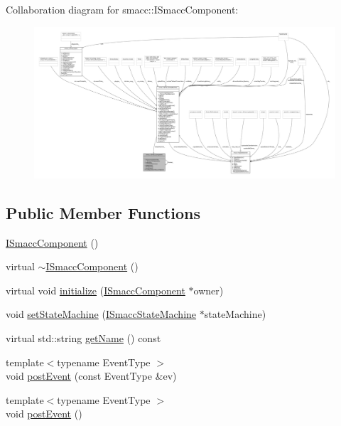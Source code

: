 Collaboration diagram for smacc\+:\+:I\+Smacc\+Component\+:
\nopagebreak
\begin{figure}[H]
\begin{center}
\leavevmode
\includegraphics[width=350pt]{classsmacc_1_1ISmaccComponent__coll__graph}
\end{center}
\end{figure}
\subsection*{Public Member Functions}
\begin{DoxyCompactItemize}
\item 
\hyperlink{classsmacc_1_1ISmaccComponent_a43952d7269ddb81d017a80f018fe502e}{I\+Smacc\+Component} ()
\item 
virtual \hyperlink{classsmacc_1_1ISmaccComponent_a46f5cfc6a308de938b6ee3a5e80a8fe9}{$\sim$\+I\+Smacc\+Component} ()
\item 
virtual void \hyperlink{classsmacc_1_1ISmaccComponent_a15c111f1a7c6fe37e77351b382d2f095}{initialize} (\hyperlink{classsmacc_1_1ISmaccComponent}{I\+Smacc\+Component} $\ast$owner)
\item 
void \hyperlink{classsmacc_1_1ISmaccComponent_afe57665a6982475e8f9c2a5885e986e1}{set\+State\+Machine} (\hyperlink{classsmacc_1_1ISmaccStateMachine}{I\+Smacc\+State\+Machine} $\ast$state\+Machine)
\item 
virtual std\+::string \hyperlink{classsmacc_1_1ISmaccComponent_aa314809a7fd3516461e31cc120d0cfe7}{get\+Name} () const 
\item 
{\footnotesize template$<$typename Event\+Type $>$ }\\void \hyperlink{classsmacc_1_1ISmaccComponent_a687dead5b87a3b9781b9bf6ab0b7afa5}{post\+Event} (const Event\+Type \&ev)
\item 
{\footnotesize template$<$typename Event\+Type $>$ }\\void \hyperlink{classsmacc_1_1ISmaccComponent_a84455564c2c4b90be58e900050232722}{post\+Event} ()
\end{DoxyCompactItemize}
